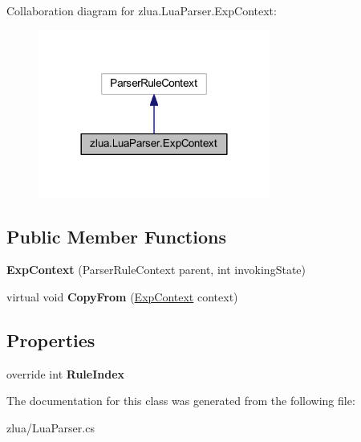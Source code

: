 Collaboration diagram for zlua.\+Lua\+Parser.\+Exp\+Context\+:
\nopagebreak
\begin{figure}[H]
\begin{center}
\leavevmode
\includegraphics[width=216pt]{classzlua_1_1_lua_parser_1_1_exp_context__coll__graph}
\end{center}
\end{figure}
\subsection*{Public Member Functions}
\begin{DoxyCompactItemize}
\item 
\mbox{\label{classzlua_1_1_lua_parser_1_1_exp_context_a896315e970d6e777701e83adc43e1dfd}} 
{\bfseries Exp\+Context} (Parser\+Rule\+Context parent, int invoking\+State)
\item 
\mbox{\label{classzlua_1_1_lua_parser_1_1_exp_context_a45a67b74d10763844e6b16b5e1bd480f}} 
virtual void {\bfseries Copy\+From} (\mbox{\hyperlink{classzlua_1_1_lua_parser_1_1_exp_context}{Exp\+Context}} context)
\end{DoxyCompactItemize}
\subsection*{Properties}
\begin{DoxyCompactItemize}
\item 
\mbox{\label{classzlua_1_1_lua_parser_1_1_exp_context_a3904b8d26d55af399a665555a6451152}} 
override int {\bfseries Rule\+Index}
\end{DoxyCompactItemize}


The documentation for this class was generated from the following file\+:\begin{DoxyCompactItemize}
\item 
zlua/Lua\+Parser.\+cs\end{DoxyCompactItemize}
